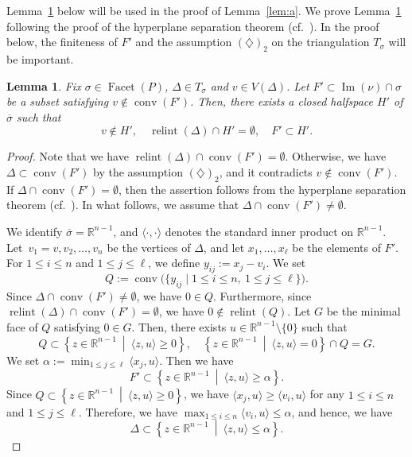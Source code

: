\documentclass[11pt]{article}
\newtheorem{lem}[theo]{Lemma}
\theoremstyle{definition}
\numberwithin{equation}{section}
\begin{document}
Lemma~\ref{lem:sep} below will be used in the proof of Lemma~\ref{lem:a}. 
We prove Lemma~\ref{lem:sep} following the proof of the hyperplane separation theorem (cf.\ \cite[Theorem 1.17]{HW}). 
In the proof below, the finiteness of $F'$ and the assumption $(\diamondsuit) _2$ on 
the triangulation $T_{\sigma}$ will be important. 
\begin{lem}\label{lem:sep}
Fix $\sigma \in \operatorname{Facet}(P)$, $\Delta \in T_{\sigma}$ and $v \in V(\Delta)$. 
Let $F' \subset \operatorname{Im}(\nu) \cap \sigma$ be a subset satisfying $v \not \in \operatorname{conv} (F')$. 
Then, there exists a closed halfspace $H'$ of $\overline{\sigma}$ such that 
\[
v \not \in H', \quad \operatorname{relint}(\Delta) \cap H' = \emptyset, \quad F' \subset H'. 
\]
\end{lem}
\begin{proof}
Note that we have $\operatorname{relint}(\Delta) \cap \operatorname{conv} (F') = \emptyset$. 
Otherwise, we have $\Delta \subset \operatorname{conv} (F')$ by the assumption $(\diamondsuit)_2$, 
and it contradicts $v \not \in \operatorname{conv} (F')$. 
If $\Delta \cap \operatorname{conv} (F') = \emptyset$, then the assertion follows from 
the hyperplane separation theorem (cf.\ \cite[Theorem 1.17]{HW}). 
In what follows, we assume that $\Delta \cap \operatorname{conv} (F') \not = \emptyset$. 

We identify $\overline{\sigma} = \mathbb{R}^{n-1}$, 
and $\langle \cdot , \cdot \rangle$ denotes the standard inner product on $\mathbb{R}^{n-1}$. 
Let~$v_1 = v, v_2, \ldots, v_n$ be the vertices of $\Delta$, and 
let $x_1, \ldots , x_{\ell}$ be the elements of $F'$. 
For $1 \le i \le n$ and $1 \le j \le \ell$, we define $y_{ij} := x_j - v_i$. 
We set 
\[
Q := \operatorname{conv}\bigl( \{ y_{ij} \mid 1 \le i \le n, \ 1 \le j \le \ell \} \bigr). 
\]
Since $\Delta \cap \operatorname{conv} (F') \not = \emptyset$, we have $0 \in Q$. 
Furthermore, since $\operatorname{relint}(\Delta) \cap \operatorname{conv} (F') = \emptyset$, 
we have $0 \not \in \operatorname{relint}(Q)$. 
Let $G$ be the minimal face of $Q$ satisfying $0 \in G$. 
Then, there exists $u \in \mathbb{R}^{n-1} \setminus \{ 0 \}$ such that 
\[
Q \subset \left\{ z \in \mathbb{R}^{n-1} \ \middle | \  \langle z, u \rangle \ge 0 \right \}, \quad 
\left\{ z \in \mathbb{R}^{n-1} \ \middle | \  \langle z, u \rangle = 0 \right \} \cap Q = G. 
\]
We set $\alpha := \min _{1 \le j \le \ell} \langle x_j, u \rangle$. 
Then we have
\[\tag{1}
F' \subset \left\{ z \in \mathbb{R}^{n-1} \ \middle | \  \langle z, u \rangle \ge \alpha \right \}. 
\]
Since $Q \subset \left\{ z \in \mathbb{R}^{n-1} \ \middle | \  \langle z, u \rangle \ge 0 \right \}$, 
we have $\langle x_j, u \rangle \ge \langle v_i, u \rangle$ for any $1 \le i \le n$ and $1 \le j \le \ell$. 
Therefore, we have $\max _{1 \le i \le n} \langle v_i, u \rangle \le \alpha$, and hence, we have
\[\tag{2}
\Delta \subset \left\{ z \in \mathbb{R}^{n-1} \ \middle | \  \langle z, u \rangle \le \alpha \right \}.
\]


\end{proof}
\end{document}
